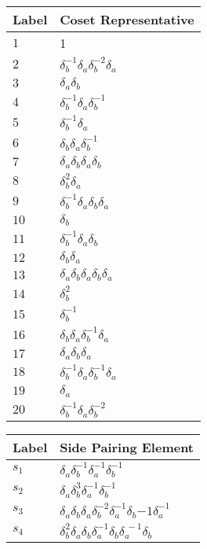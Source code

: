 \documentclass{article}
\begin{document}

\begin{center}
\begin{tabular}{ll}
\toprule
Label & Coset Representative\\
\midrule
$1$ & 1 \\
$2$ & $\delta_b^{-1}\delta_a^{}\delta_b^{-2}\delta_a^{}$ \\
$3$ & $\delta_a^{}\delta_b^{}$ \\
$4$ & $\delta_b^{-1}\delta_a^{}\delta_b^{-1}$ \\
$5$ & $\delta_b^{-1}\delta_a^{}$ \\
$6$ & $\delta_b^{}\delta_a^{}\delta_b^{-1}$ \\
$7$ & $\delta_a^{}\delta_b^{}\delta_a^{}\delta_b^{}$ \\
$8$ & $\delta_b^{2}\delta_a^{}$ \\
$9$ & $\delta_b^{-1}\delta_a^{}\delta_b^{}\delta_a^{}$ \\
$10$ & $\delta_b^{}$ \\
$11$ & $\delta_b^{-1}\delta_a^{}\delta_b^{}$ \\
$12$ & $\delta_b^{}\delta_a^{}$ \\
$13$ & $\delta_a^{}\delta_b^{}\delta_a^{}\delta_b^{}\delta_a^{}$ \\
$14$ & $\delta_b^{2}$ \\
$15$ & $\delta_b^{-1}$ \\
$16$ & $\delta_b^{}\delta_a^{}\delta_b^{-1}\delta_a^{}$ \\
$17$ & $\delta_a^{}\delta_b^{}\delta_a^{}$ \\
$18$ & $\delta_b^{-1}\delta_a^{}\delta_b^{-1}\delta_a^{}$ \\
$19$ & $\delta_a^{}$ \\
$20$ & $\delta_b^{-1}\delta_a^{}\delta_b^{-2}$ \\
\bottomrule
\end{tabular}
\hfill
\begin{tabular}{ll}
\toprule
Label & Side Pairing Element\\
\midrule
$s_{1}$ & $\delta_a^{}\delta_b^{-1}\delta_a^{-1}\delta_b^{-1}$ \\
$s_{2}$ & $\delta_a^{}\delta_b^{3}\delta_a^{-1}\delta_b^{-1}$ \\
$s_{3}$ & $\delta_a^{}\delta_b^{}\delta_a^{}\delta_b^{-2}\delta_a^{-1}\delta_b^\
{-1}\delta_a^{-1}$ \\
$s_{4}$ & $\delta_b^{2}\delta_a^{}\delta_b^{}\delta_a^{-1}\delta_b^{}\delta_a^{\
-1}\delta_b^{}$ \\

\end{tabular}
\end{center}
\end{document}
